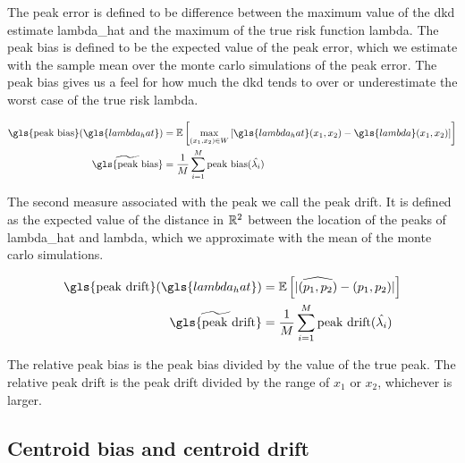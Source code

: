 The \gls{peak error} is defined to be difference between the maximum value of the \gls{dkd} estimate \gls{lambda_hat} and the maximum of the true risk function \gls{lambda}.
The \gls{peak bias} is defined to be the expected value of the \gls{peak error},
which we estimate with the sample mean over the monte carlo simulations of the \gls{peak error}.
The \gls{peak bias} gives us a feel for how much the \gls{dkd} tends to over or underestimate the worst case of the true risk \gls{lambda}.

\begin{align}
    \mbox{\gls{peak bias}}(\gls{lambda_hat})  & = \E \left[
                                \max_{(x_1,x_2) \in W} \left[
                                    {\gls{lambda_hat}\xvec} - \gls{lambda}\xvec
                                \right]
                            \right]
                            \\
    \widetilde{\mbox{\gls{peak bias}}} & = \frac{1}{M} \sum_{i=1}^{M} \mbox{peak bias}(\hat{\lambda_i})%
\end{align}

The second measure associated with the peak we call the \gls{peak drift}.
It is defined as the expected value of the distance in $\mathbb{R}^2$ between the location of the peaks of \gls{lambda_hat} and \gls{lambda}, which we approximate with the mean of the monte carlo simulations.

\begin{align}
    \mbox{\gls{peak drift}}(\gls{lambda_hat}) & = \E \left[%
                            |\widehat{(p_1, p_2)} - (p_1, p_2)|%
                        \right] \\%
    \widetilde{\mbox{\gls{peak drift}}}
        & = \frac{1}{M} \sum_{i=1}^{M} \mbox{peak drift}(\hat{\lambda_i})%
\end{align}

The \gls{relative peak bias} is the \gls{peak bias} divided by the value of the true peak.
The \gls{relative peak drift} is the \gls{peak drift} divided by the range of $x_1$ or $x_2$, whichever is larger.

\subsection{Centroid bias and centroid drift}
\label{subsec:method:centroid_bias}

